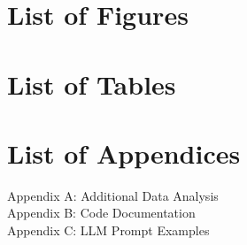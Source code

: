 \newpage
\tableofcontents
\vspace{1em}
\section*{List of Figures}
\listoffigures
\vspace{1em}
\section*{List of Tables}
\listoftables
\vspace{1em}
\section*{List of Appendices}
\noindent Appendix A: Additional Data Analysis \dotfill \pageref{appendix:a}\\
\noindent Appendix B: Code Documentation \dotfill \pageref{appendix:b}\\
\noindent Appendix C: LLM Prompt Examples \dotfill \pageref{appendix:c}
